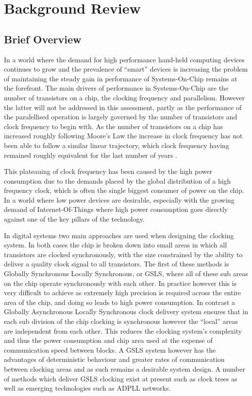 \documentclass[11pt,english,british]{report}
\begin{document}
\chapter{Background Review}
\section{Brief Overview}
In a world where the demand for high performance hand-held computing devices continues to grow and the prevalence of ``smart'' devices is increasing the problem of maintaining the steady gain in performance of Systems-On-Chip remains at the forefront. %
The main drivers of performance in Systems-On-Chip are the number of transistors on a chip, the clocking frequency and parallelism. However the latter will not be addressed in this assessment, partly as the performance of the paralellised operation is largely governed by the number of transistors and clock frequency to begin with. %
As the number of transistors on a chip has increased roughly following Moore's Law the increase in clock frequency has not been able to follow a similar linear trajectory, which clock frequency having remained roughly equivalent for the last number of years \cite{ross2008cpu}.

This plateauing of clock frequency has been caused by the high power consumption due to the demands placed by the global distribution of a high frequency clock, which is often the single biggest consumer of power on the chip. %
In a world where low power devices are desirable, especially with the growing demand of Internet-Of-Things where high power consumption goes directly against one of the key pillars of the technology. %

In digital systems two main approaches are used when designing the clocking system. In both cases the chip is broken down into small areas in which all transistors are clocked synchronously, with the size constrained by the ability to deliver a quality clock signal to all transistors. The first of these methods is Globally Synchronous Locally Synchronous, or GSLS, where all of these sub areas on the chip operate synchronously with each other. In practice however this is very difficult to achieve as extremely high precision is required across the entire area of the chip, and doing so leads to high power consumption.
In contrast a Globally Asynchronous Locally Synchronous clock delivery system ensures that in each sub division of the chip clocking is synchronous however the ``local'' areas are independent from each other. This reduces the clocking system's complexity and thus the power consumption and chip area used at the expense of communication speed between blocks. %
A GSLS system however has the advantages of deterministic behaviour and greater rates of communication between clocking areas and as such remains a desirable system design. A number of methods which deliver GSLS clocking exist at present such as clock trees as well as emerging technologies such as ADPLL networks.
\end{document}
